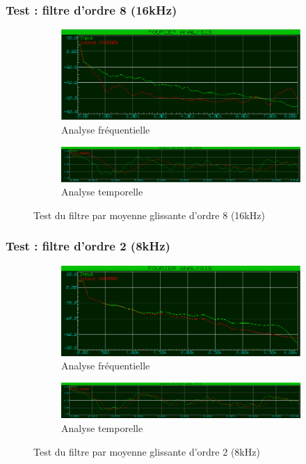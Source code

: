\documentclass{article}
\begin{document}
    \subsubsection{Test : filtre d'ordre 8 (16kHz)}
    \begin{figure}[H]
        \centering
        \begin{subfigure}[b]{\textwidth}
            \centering
            \includegraphics[width=.6\textwidth]{./images/spectrum_mov_avg_8_16k.png}
            \caption{Analyse fréquentielle}
        \end{subfigure}
        \begin{subfigure}[b]{\textwidth}
            \centering
            \includegraphics[width=\textwidth]{./images/out_mov_avg_8_16k.png}
            \caption{Analyse temporelle}
        \end{subfigure}
        \caption{Test du filtre par moyenne glissante d'ordre 8 (16kHz)}
    \end{figure}

    \subsubsection{Test : filtre d'ordre 2 (8kHz)}
    \begin{figure}[H]
        \centering
        \begin{subfigure}[b]{\textwidth}
            \centering
            \includegraphics[width=.6\textwidth]{./images/spectrum_mov_avg_2_8k.png}
            \caption{Analyse fréquentielle}
        \end{subfigure}
        \begin{subfigure}[b]{\textwidth}
            \centering
            \includegraphics[width=\textwidth]{./images/out_mov_avg_2_8k.png}
            \caption{Analyse temporelle}
        \end{subfigure}
        \caption{Test du filtre par moyenne glissante d'ordre 2 (8kHz)}
    \end{figure}
\end{document}
